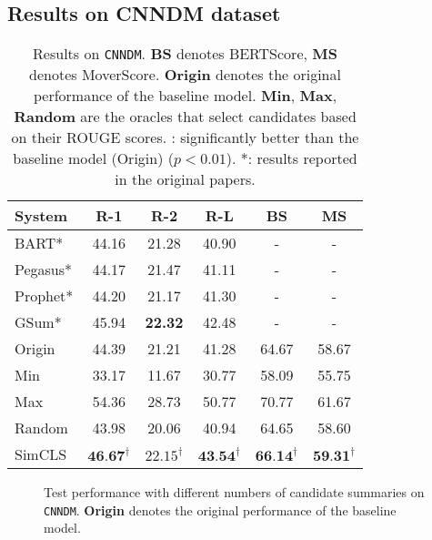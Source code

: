 \documentclass[11pt,a4paper]{article}
\begin{document}
\subsection{Results on CNNDM dataset}
\begin{table}[t!]
\small
\centering
\addtolength{\tabcolsep}{-1pt}  
\begin{tabular}{lccccc}
\toprule
\textbf{System} & \textbf{R-1} & \textbf{R-2} & \textbf{R-L} & \textbf{BS} & \textbf{MS} \\
\midrule
 BART* & 44.16 & 21.28 & 40.90 & - & -\\
 Pegasus* & 44.17 & 21.47 & 41.11 & - & - \\
 Prophet* & 44.20 & 21.17 & 41.30 & - & - \\
 GSum* & 45.94 & \textbf{22.32} & 42.48 & - & -\\
\midrule
 Origin & 44.39 & 21.21 & 41.28  & 64.67 & 58.67  \\
 Min & 33.17 & 11.67 & 30.77 & 58.09 & 55.75 \\
 Max & 54.36 & 28.73 & 50.77 & 70.77 & 61.67 \\
 Random & 43.98 & 20.06 & 40.94 & 64.65 & 58.60 \\
 \midrule
 SimCLS & $\textbf{46.67}^{\dag}$ & $22.15^{\dag}$ & $\textbf{43.54}^{\dag}$ & $\textbf{66.14}^\dag$ & $\textbf{59.31}^\dag$ \\
\bottomrule
\end{tabular}
\addtolength{\tabcolsep}{+1pt} 
\caption{\label{tab:cnndm} Results on \texttt{CNNDM}.
\textbf{BS} denotes BERTScore, \textbf{MS} denotes MoverScore. 
\textbf{Origin} denotes the original performance of the baseline model.
\textbf{Min}, \textbf{Max}, \textbf{Random} are the oracles that select candidates based on their ROUGE scores.
\dag: significantly better than the baseline model (Origin) ($p < 0.01$).
*: results reported in the original papers.}
\end{table}

\begin{figure}
    \raggedright
    \caption{Test performance with different numbers of candidate summaries on \texttt{CNNDM}. \textbf{Origin} denotes the original performance of the baseline model.}
    \label{fig:num}
\end{figure}
\end{document}
